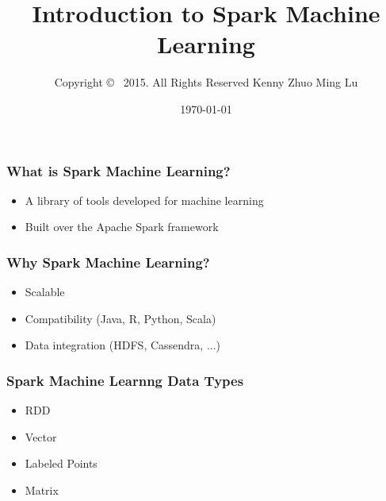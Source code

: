 \documentclass{beamer}
\begin{document}
\title{Introduction to Spark Machine Learning} 
\author{ \white 
 Copyright \copyright~ 2015. All Rights Reserved
Kenny Zhuo Ming Lu 
}
\date{\today} 


%

\frame{\titlepage} 



\begin{frame}
\frametitle{What is Spark Machine Learning?}
\begin{itemize}
\item A library of tools developed for machine learning
\item Built over the Apache Spark framework
\end{itemize}
\end{frame}


\begin{frame}
\frametitle{Why Spark Machine Learning?}

\begin{itemize}
 \item Scalable
 \item Compatibility (Java, R, Python, Scala)
 \item Data integration (HDFS, Cassendra, ...)
\end{itemize}
\end{frame}


\begin{frame}[fragile]
\frametitle{Spark Machine Learnng Data Types}
\begin{itemize}
\item RDD
\item Vector
\item Labeled Points
\item Matrix
\end{itemize}  
\end{frame}
\end{document}
